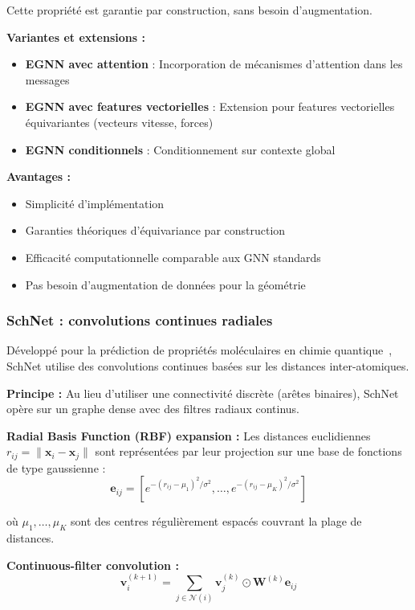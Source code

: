 Cette propriété est garantie par construction, sans besoin d'augmentation.

\textbf{Variantes et extensions :}

\begin{itemize}
    \item \textbf{EGNN avec attention} : Incorporation de mécanismes d'attention dans les messages
    \item \textbf{EGNN avec features vectorielles} : Extension pour features vectorielles équivariantes (vecteurs vitesse, forces)
    \item \textbf{EGNN conditionnels} : Conditionnement sur contexte global
\end{itemize}

\textbf{Avantages :}
\begin{itemize}
    \item Simplicité d'implémentation
    \item Garanties théoriques d'équivariance par construction
    \item Efficacité computationnelle comparable aux GNN standards
    \item Pas besoin d'augmentation de données pour la géométrie
\end{itemize}

\subsubsection{SchNet : convolutions continues radiales}

Développé pour la prédiction de propriétés moléculaires en chimie quantique~\cite{Schutt2017,Schutt2018}, SchNet utilise des convolutions continues basées sur les distances inter-atomiques.

\textbf{Principe :}
Au lieu d'utiliser une connectivité discrète (arêtes binaires), SchNet opère sur un graphe dense avec des filtres radiaux continus.

\textbf{Radial Basis Function (RBF) expansion :}
Les distances euclidiennes $r_{ij} = \|\mathbf{x}_i - \mathbf{x}_j\|$ sont représentées par leur projection sur une base de fonctions de type gaussienne :
\[
\mathbf{e}_{ij} = [e^{-(r_{ij} - \mu_1)^2/\sigma^2}, \ldots, e^{-(r_{ij} - \mu_K)^2/\sigma^2}]
\]

où $\mu_1, \ldots, \mu_K$ sont des centres régulièrement espacés couvrant la plage de distances.

\textbf{Continuous-filter convolution :}
\[
\mathbf{v}_i^{(k+1)} = \sum_{j \in \mathcal{N}(i)} \mathbf{v}_j^{(k)} \odot \mathbf{W}^{(k)} \mathbf{e}_{ij}
\]

